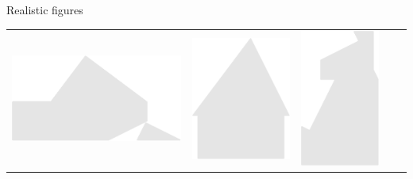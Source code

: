 \documentclass[14pt]{beamer}
\begin{document}
\begin{frame}{Realistic figures}
\begin{center}
{\begin{tabular}{ccccc}
                \includegraphics[scale=0.21]{figures/figure026b.pdf} &
                \includegraphics[scale=0.21]{figures/figure026ad.pdf} &
                \includegraphics[scale=0.21]{figures/figure026h.pdf} \\

\end{tabular}}
\end{center}
\end{frame}
\end{document}

